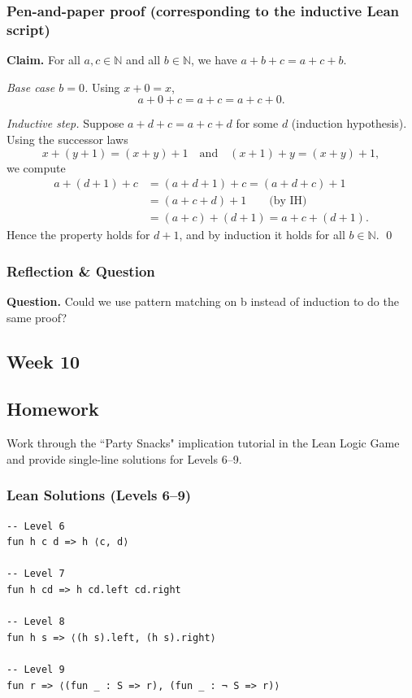 \documentclass{article}
\theoremstyle{theorem}
\theoremstyle{definition}
\theoremstyle{remark}
\begin{document}
\subsubsection*{Pen-and-paper proof (corresponding to the inductive Lean script)}
\textbf{Claim.} For all $a,c\in\mathbb N$ and all $b\in\mathbb N$, we have $a+b+c=a+c+b$.

\emph{Base case $b=0$.} Using $x+0=x$,
\[
a+0+c = a+c = a+c+0.
\]

\emph{Inductive step.} Suppose $a+d+c=a+c+d$ for some $d$ (induction hypothesis). Using the successor laws
\[
x+(y+1)=(x+y)+1 \quad\text{and}\quad (x+1)+y=(x+y)+1,
\]
we compute
\[
\begin{aligned}
a+(d+1)+c
&= (a+d+1)+c
 = (a+d+c)+1
\\&= (a+c+d)+1 \qquad\text{(by IH)}
\\&= (a+c)+(d+1)
= a+c+(d+1).
\end{aligned}
\]
Hence the property holds for $d+1$, and by induction it holds for all $b\in\mathbb N$. \qed

\subsubsection*{Reflection \& Question}
\textbf{Question.} Could we use pattern matching on b instead of induction to do the same proof?

\subsection{Week 10}\label{sec:week10}
\smallskip
\subsection*{Homework}
Work through the “Party Snacks" implication tutorial in the Lean Logic Game and provide single‑line solutions for Levels 6–9.

\subsubsection*{Lean Solutions (Levels 6–9)}
\begin{lstlisting}
-- Level 6
fun h c d => h ⟨c, d⟩

-- Level 7
fun h cd => h cd.left cd.right

-- Level 8
fun h s => ⟨(h s).left, (h s).right⟩

-- Level 9
fun r => ⟨(fun _ : S => r), (fun _ : ¬ S => r)⟩
\end{lstlisting}
\end{document}

